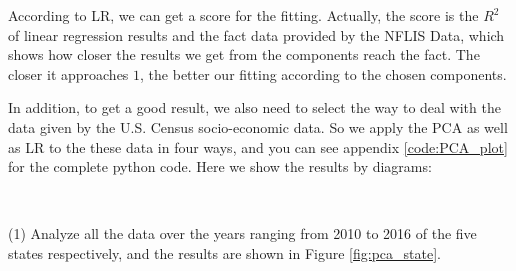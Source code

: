 \documentclass{mcmthesis}
\begin{document}
According to LR, we can get a score for the fitting. Actually, the score is the $R^{2}$ of linear regression results and the fact data provided by the NFLIS Data, which shows how closer the results we get from the components reach the fact. The closer it approaches $1$, the better our fitting according to the chosen components.

In addition, to get a good result, we also need to select the way to deal with the data given by the U.S. Census socio-economic data. So we apply the PCA as well as LR to the these data in four ways, and you can see appendix \ref{code:PCA_plot} for the complete python code. Here we show the results by diagrams:

~\smallskip

(1) Analyze all the data over the years ranging from 2010 to 2016 of the five states respectively, and the results are shown in Figure \ref{fig:pca_state}.
\end{document}
